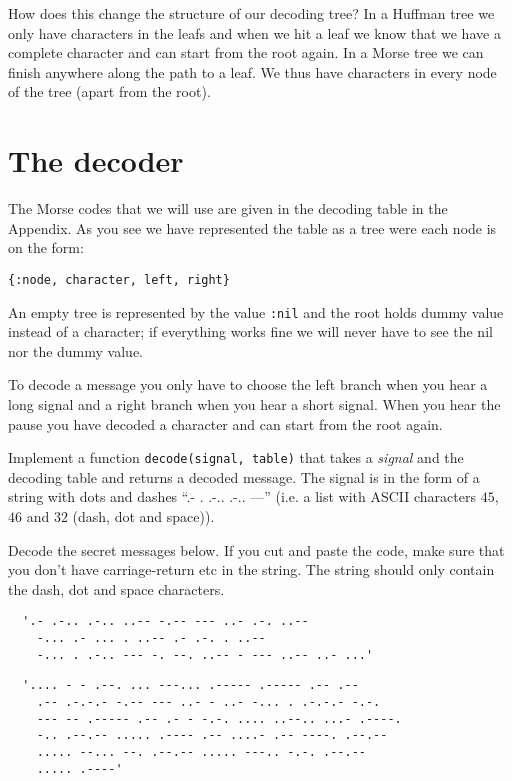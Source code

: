 \documentclass[a4paper,11pt]{article}
\begin{document}
How does this change the structure of our decoding tree? In a Huffman
tree we only have characters in the leafs and when we hit a leaf we
know that we have a complete character and can start from the root
again. In a Morse tree we can finish anywhere along the path to a
leaf. We thus have characters in every node of the tree (apart from the
root).



\section{The decoder}

The Morse codes that we will use are given in the decoding table in
the Appendix. As you see we have represented the table as a tree were
each node is on the form:

\begin{verbatim}
{:node, character, left, right}
\end{verbatim}

An empty tree is represented by the value {\tt :nil} and the root holds
dummy value instead of a character; if everything works fine we
will never have to see the nil nor the dummy value.

To decode a message you only have to choose the left branch when you
hear a long signal and a right branch when you hear a short
signal. When you hear the pause you have decoded a character and can
start from the root again. 

Implement a function {\tt decode(signal, table)} that takes a {\em
  signal} and the decoding table and returns a decoded message. The
signal is in the form of a string with dots and dashes ``.-
. .-.. .-.. ---'' (i.e. a list with ASCII characters $45$, $46$ and
$32$ (dash, dot and space)).

Decode the secret messages below. If you cut and paste the code, make
sure that you don't have carriage-return etc in the string. The string
should only contain the dash, dot and space characters. 

\begin{verbatim}
  '.- .-.. .-.. ..-- -.-- --- ..- .-. ..-- 
    -... .- ... . ..-- .- .-. . ..-- 
    -... . .-.. --- -. --. ..-- - --- ..-- ..- ...'
\end{verbatim}

\begin{verbatim}
  '.... - - .--. ... ---... .----- .----- .-- .-- 
    .-- .-.-.- -.-- --- ..- - ..- -... . .-.-.- -.-. 
    --- -- .----- .-- .- - -.-. .... ..--.. ...- .----. 
    -.. .--.-- ..... .---- .-- ....- .-- ----. .--.-- 
    ..... --... --. .--.-- ..... ---.. -.-. .--.-- 
    ..... .----'
\end{verbatim}
\end{document}
